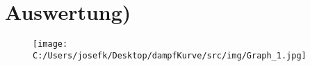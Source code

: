 \section{Auswertung)}
\begin{figure}[H]
    \texttt{[image: C:/Users/josefk/Desktop/dampfKurve/src/img/Graph\_1.jpg]}
\end{figure}

\clearpage